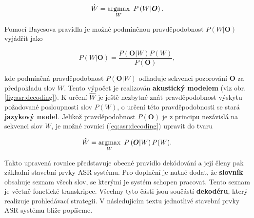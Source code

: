 \begin{equation}
  \hat{W} = \operatorname*{argmax}_W\ P\left(W | \boldsymbol{O}\right).
  \label{eq:asr:decoding}
\end{equation}

Pomocí Bayesova pravidla je možné podmíněnou pravděpodobnost $P\left(W | \boldsymbol{O}\right)$ vyjádřit jako

\begin{equation}
  P\left(W | \boldsymbol{O}\right) = \frac{P(\boldsymbol{O}|W)P(W)}{P(\boldsymbol{O})},
\end{equation}

\noindent kde podmíněná pravděpodobnost $P(\boldsymbol{O} | W)$ odhaduje sekvenci pozorování $\boldsymbol{O}$ za předpokladu slov $W$. Tento výpočet je realizován \textbf{akustický modelem} (viz obr. \ref{fig:asr:decoding}). K určení $\hat{W}$ je ještě nezbytné znát pravděpodobnost výskytu požadované posloupnosti slov $P\left(W\right)$, o určení této pravděpodobnosti se stará \textbf{jazykový model}. Jelikož pravděpodobnost $P(\boldsymbol{O})$ je z principu nezávislá na sekvenci slov $W$, je možné rovnici (\ref{eq:asr:decoding}) upravit do tvaru

\begin{equation}
  \hat{W} = \argmax_W\ P\left(\boldsymbol{O} | W\right)P(W).
  \label{eq:asr:decoding:generic}
\end{equation}

Takto upravená rovnice představuje obecné pravidlo dekódování a její členy pak základní stavební prvky ASR systému. Pro doplnění je nutné dodat, že \textbf{slovník} obsahuje seznam všech slov, se kterými je systém schopen pracovat. Tento seznam je včetně fonetické transkripce. Všechny tyto části jsou součástí \textbf{dekodéru}, který realizuje prohledávací strategii. V následujícím textu jednotlivé stavební prvky ASR systému blíže popíšeme.





% 


